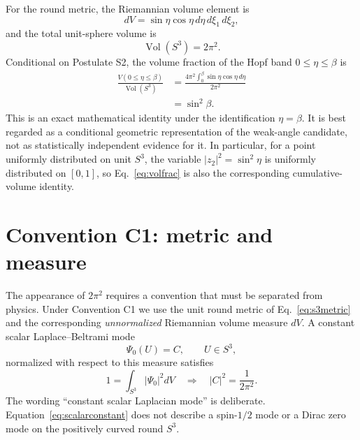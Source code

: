 \documentclass[10pt,twocolumn]{article}
\newcommand{\Vol}{\operatorname{Vol}}
\begin{document}
For the round metric, the Riemannian volume element is
\begin{equation}
dV=\sin\eta\cos\eta\,d\eta\,d\xi_1\,d\xi_2,
\end{equation}
and the total unit-sphere volume is
\begin{equation}
\Vol(S^3)=2\pi^2.
\label{eq:s3volume}
\end{equation}
Conditional on Postulate S2, the volume fraction of the Hopf band $0\le\eta\le\beta$ is
\begin{align}
\frac{V(0\le\eta\le\beta)}{\Vol(S^3)}
&=\frac{4\pi^2\int_0^\beta\sin\eta\cos\eta\,d\eta}{2\pi^2}\\
&=\boxed{\sin^2\beta}.
\label{eq:volfrac}
\end{align}
This is an exact mathematical identity under the identification $\eta=\beta$.  It is best regarded
as a conditional geometric representation of the weak-angle candidate, not as statistically
independent evidence for it.  In particular, for a point uniformly distributed on unit $S^3$, the
variable $|z_2|^2=\sin^2\eta$ is uniformly distributed on $[0,1]$, so Eq.~\eqref{eq:volfrac} is also
the corresponding cumulative-volume identity.

\section{Convention C1: metric and measure}
\label{sec:measure}

The appearance of $2\pi^2$ requires a convention that must be separated from physics.  Under
Convention C1 we use the unit round metric of Eq.~\eqref{eq:s3metric} and the corresponding
\emph{unnormalized} Riemannian volume measure $dV$.  A constant scalar Laplace--Beltrami mode
\begin{equation}
\Psi_0(U)=C,
\qquad U\in S^3,
\end{equation}
normalized with respect to this measure satisfies
\begin{equation}
1=\int_{S^3}|\Psi_0|^2dV
\quad\Rightarrow\quad
|C|^2=\frac{1}{2\pi^2}.
\label{eq:scalarconstant}
\end{equation}
The wording ``constant scalar Laplacian mode'' is deliberate.  Equation~\eqref{eq:scalarconstant}
does not describe a spin-$1/2$ mode or a Dirac zero mode on the positively curved round $S^3$.
\end{document}
